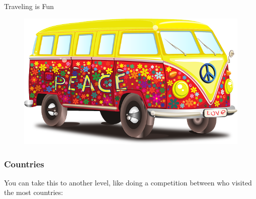 \begin{frame}{Traveling is Fun}
\begin{figure}[!ht]
\centering
\includegraphics[width=1\linewidth]{img/volkswagen.png}
\end{figure}
\end{frame}

\subsubsection{Countries}

You can take this to another level, like doing a
competition between who visited the most countries:



